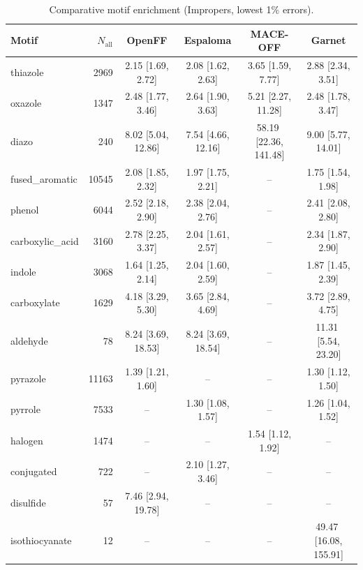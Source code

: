 \begin{table}[h!]
  \centering
  \small
  \setlength{\tabcolsep}{5pt}
  \renewcommand{\arraystretch}{1.15}
  \begin{tabular}{l r c c c c}
    \hline
    Motif & $N_\mathrm{all}$ & OpenFF & Espaloma & MACE-OFF & Garnet \\
    \hline
    thiazole & 2969 & 2.15\,\,[1.69, 2.72] & 2.08\,\,[1.62, 2.63] & 3.65\,\,[1.59, 7.77] & 2.88\,\,[2.34, 3.51] \\
    oxazole & 1347 & 2.48\,\,[1.77, 3.46] & 2.64\,\,[1.90, 3.63] & 5.21\,\,[2.27, 11.28] & 2.48\,\,[1.78, 3.47] \\
    diazo & 240 & 8.02\,\,[5.04, 12.86] & 7.54\,\,[4.66, 12.16] & 58.19\,\,[22.36, 141.48] & 9.00\,\,[5.77, 14.01] \\
    \hdashline
    fused\_aromatic & 10545 & 2.08\,\,[1.85, 2.32] & 1.97\,\,[1.75, 2.21] & -- & 1.75\,\,[1.54, 1.98] \\
    phenol & 6044 & 2.52\,\,[2.18, 2.90] & 2.38\,\,[2.04, 2.76] & -- & 2.41\,\,[2.08, 2.80] \\
    carboxylic\_acid & 3160 & 2.78\,\,[2.25, 3.37] & 2.04\,\,[1.61, 2.57] & -- & 2.34\,\,[1.87, 2.90] \\
    indole & 3068 & 1.64\,\,[1.25, 2.14] & 2.04\,\,[1.60, 2.59] & -- & 1.87\,\,[1.45, 2.39] \\
    carboxylate & 1629 & 4.18\,\,[3.29, 5.30] & 3.65\,\,[2.84, 4.69] & -- & 3.72\,\,[2.89, 4.75] \\
    aldehyde & 78 & 8.24\,\,[3.69, 18.53] & 8.24\,\,[3.69, 18.54] & -- & 11.31\,\,[5.54, 23.20] \\
    \hdashline
    pyrazole & 11163 & 1.39\,\,[1.21, 1.60] & -- & -- & 1.30\,\,[1.12, 1.50] \\
    pyrrole & 7533 & -- & 1.30\,\,[1.08, 1.57] & -- & 1.26\,\,[1.04, 1.52] \\
    \hdashline
    halogen & 1474 & -- & -- & 1.54\,\,[1.12, 1.92] & -- \\
    conjugated & 722 & -- & 2.10\,\,[1.27, 3.46] & -- & -- \\
    disulfide & 57 & 7.46\,\,[2.94, 19.78] & -- & -- & -- \\
    isothiocyanate & 12 & -- & -- & -- & 49.47\,\,[16.08, 155.91] \\
    \hline
  \end{tabular}
  \caption{Comparative motif enrichment (Impropers, lowest 1\% errors).}
  \label{tab:compare_impropers_best}
\end{table}